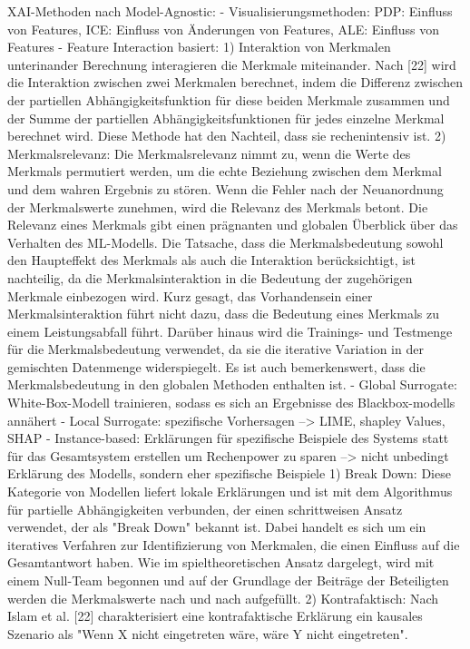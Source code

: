 XAI-Methoden nach \cite{hanif2021survey}
Model-Agnostic: 
- Visualisierungsmethoden: PDP: Einfluss von Features, ICE: Einfluss von Änderungen von Features, ALE: Einfluss von Features
- Feature Interaction basiert: 
 1) Interaktion von Merkmalen unterinander Berechnung interagieren die Merkmale miteinander. Nach [22] wird die Interaktion zwischen zwei Merkmalen berechnet, indem die Differenz zwischen der partiellen Abhängigkeitsfunktion für diese beiden Merkmale zusammen und der Summe der partiellen Abhängigkeitsfunktionen für jedes einzelne Merkmal berechnet wird. Diese Methode hat den Nachteil, dass sie rechenintensiv ist. 
 2) Merkmalsrelevanz: Die Merkmalsrelevanz nimmt zu, wenn die Werte des Merkmals permutiert werden, um die echte Beziehung zwischen dem Merkmal und dem wahren Ergebnis zu stören. Wenn die Fehler nach der Neuanordnung der Merkmalswerte zunehmen, wird die Relevanz des Merkmals betont. Die Relevanz eines Merkmals gibt einen prägnanten und globalen Überblick über das Verhalten des ML-Modells. Die Tatsache, dass die Merkmalsbedeutung sowohl den Haupteffekt des Merkmals als auch die Interaktion berücksichtigt, ist nachteilig, da die Merkmalsinteraktion in die Bedeutung der zugehörigen Merkmale einbezogen wird. Kurz gesagt, das Vorhandensein einer Merkmalsinteraktion führt nicht dazu, dass die Bedeutung eines Merkmals zu einem Leistungsabfall führt. Darüber hinaus wird die Trainings- und Testmenge für die Merkmalsbedeutung verwendet, da sie die iterative Variation in der gemischten Datenmenge widerspiegelt. Es ist auch bemerkenswert, dass die Merkmalsbedeutung in den globalen Methoden enthalten ist.
- Global Surrogate: White-Box-Modell trainieren, sodass es sich an Ergebnisse des Blackbox-modells annähert
- Local Surrogate: spezifische Vorhersagen --> LIME, shapley Values, SHAP
- Instance-based:  Erklärungen für spezifische Beispiele des Systems statt für das Gesamtsystem erstellen um Rechenpower zu sparen --> nicht unbedingt Erklärung des Modells, sondern eher spezifische Beispiele 
1) Break Down: Diese Kategorie von Modellen liefert lokale Erklärungen und ist mit dem Algorithmus für partielle Abhängigkeiten verbunden, der einen schrittweisen Ansatz verwendet, der als "Break Down" bekannt ist. Dabei handelt es sich um ein iteratives Verfahren zur Identifizierung von Merkmalen, die einen Einfluss auf die Gesamtantwort haben. Wie im spieltheoretischen Ansatz dargelegt, wird mit einem Null-Team begonnen und auf der Grundlage der Beiträge der Beteiligten werden die Merkmalswerte nach und nach aufgefüllt. 
2) Kontrafaktisch: Nach Islam et al. [22] charakterisiert eine kontrafaktische Erklärung ein kausales Szenario als "Wenn X nicht eingetreten wäre, wäre Y nicht eingetreten". 
